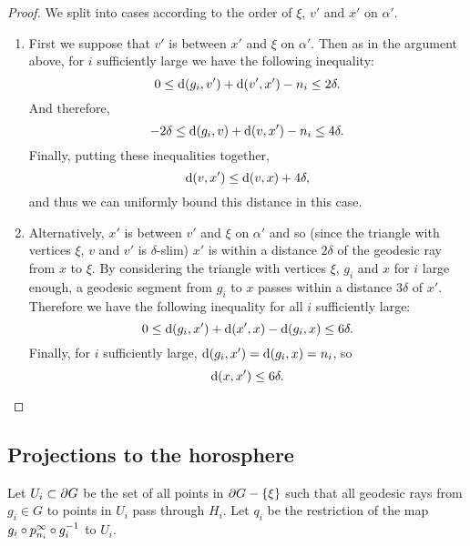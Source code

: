 \documentclass[a4paper]{article}
\begin{document}
\begin{proof}
  We split into cases according to the order of $\xi$, $v'$ and $x'$ on
  $\alpha'$.
  \begin{enumerate}
    \item
      First we suppose that $v'$ is between $x'$ and $\xi$ on $\alpha'$. Then as
      in the argument above, for $i$ sufficiently large we have the following
      inequality:
      \begin{equation*}
        0 \leq \operatorname{d}(g_i, v') + \operatorname{d}(v', x') - n_i \leq 2\delta.
      \end{equation*}
      And therefore,
      \begin{equation*}
        -2\delta \leq \operatorname{d}(g_i, v) + \operatorname{d}(v, x') - n_i \leq 4\delta.
      \end{equation*}
      Finally, putting these inequalities together,
      \begin{equation*}
        \operatorname{d}(v,x') \leq \operatorname{d}(v,x) + 4\delta,
      \end{equation*}
      and thus we can uniformly bound this distance in this case.
    \item
      Alternatively, $x'$ is between $v'$ and $\xi$ on $\alpha'$ and so (since
      the triangle with vertices $\xi$, $v$ and $v'$ is $\delta$-slim) $x'$ is
      within a distance $2\delta$ of the geodesic ray from $x$ to $\xi$. By
      considering the triangle with vertices $\xi$, $g_i$ and $x$ for $i$ large
      enough, a geodesic segment from $g_i$ to $x$ passes within a distance
      $3\delta$ of $x'$. Therefore we have the following inequality for all $i$
      sufficiently large:
      \begin{equation*}
        0 \leq \operatorname{d}(g_i, x') + \operatorname{d}(x', x) - \operatorname{d}(g_i, x) \leq 6\delta.
      \end{equation*}
      Finally, for $i$ sufficiently large, $\operatorname{d}(g_i, x') = \operatorname{d}(g_i, x) = n_i$,
      so
      \begin{equation*}
        \operatorname{d}(x,x') \leq 6\delta.\qedhere
      \end{equation*}
  \end{enumerate}
\end{proof}

\subsection{Projections to the horosphere}

\begin{definition}
  Let $U_i \subset \partial G$ be the set of all points in $\partial G -
  \left\{\xi\right\}$ such that all geodesic rays from $g_i \in G$ to points in $U_i$ pass
  through $H_i$. Let $q_i$ be the restriction of the map $g_i \circ
  p^\infty_{n_i} \circ g_i^{-1}$ to $U_i$.
\end{definition}
\end{document}
